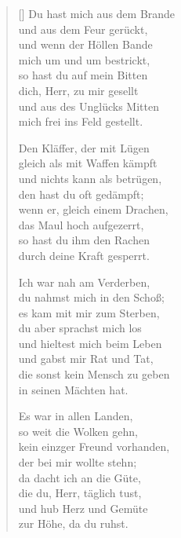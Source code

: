 \begin{multicols}{2}
\begin{verse}[\versewidth]
 Du hast mich aus dem Brande\\
und aus dem Feur gerückt,\\
und wenn der Höllen Bande\\
mich um und um bestrickt,\\
so hast du auf mein Bitten\\
dich, Herr, zu mir gesellt\\
und aus des Unglücks Mitten\\
mich frei ins Feld gestellt.

 Den Kläffer, der mit Lügen\\
gleich als mit Waffen kämpft\\
und nichts kann als betrügen,\\
den hast du oft gedämpft;\\
wenn er, gleich einem Drachen,\\
das Maul hoch aufgezerrt,\\
so hast du ihm den Rachen\\
durch deine Kraft gesperrt.

 Ich war nah am Verderben,\\
du nahmst mich in den Schoß;\\
es kam mit mir zum Sterben,\\
du aber sprachst mich los\\
und hieltest mich beim Leben\\
und gabst mir Rat und Tat,\\
die sonst kein Mensch zu geben\\
in seinen Mächten hat.

 Es war in allen Landen,\\
so weit die Wolken gehn,\\
kein einzger Freund vorhanden,\\
der bei mir wollte stehn;\\
da dacht ich an die Güte,\\
die du, Herr, täglich tust,\\
und hub Herz und Gemüte\\
zur Höhe, da du ruhst.

\end{verse}
\end{multicols}


